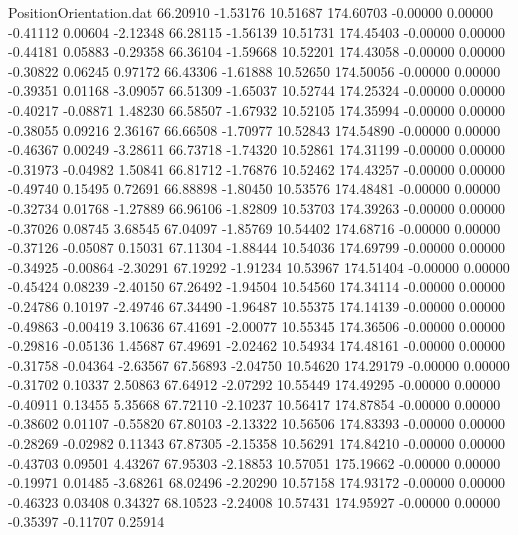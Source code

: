 \begin{filecontents}{PositionOrientation.dat}
  66.20910   -1.53176   10.51687   174.60703   -0.00000    0.00000   -0.41112    0.00604   -2.12348
  66.28115   -1.56139   10.51731   174.45403   -0.00000    0.00000   -0.44181    0.05883   -0.29358
  66.36104   -1.59668   10.52201   174.43058   -0.00000    0.00000   -0.30822    0.06245    0.97172
  66.43306   -1.61888   10.52650   174.50056   -0.00000    0.00000   -0.39351    0.01168   -3.09057
  66.51309   -1.65037   10.52744   174.25324   -0.00000    0.00000   -0.40217   -0.08871    1.48230
  66.58507   -1.67932   10.52105   174.35994   -0.00000    0.00000   -0.38055    0.09216    2.36167
  66.66508   -1.70977   10.52843   174.54890   -0.00000    0.00000   -0.46367    0.00249   -3.28611
  66.73718   -1.74320   10.52861   174.31199   -0.00000    0.00000   -0.31973   -0.04982    1.50841
  66.81712   -1.76876   10.52462   174.43257   -0.00000    0.00000   -0.49740    0.15495    0.72691
  66.88898   -1.80450   10.53576   174.48481   -0.00000    0.00000   -0.32734    0.01768   -1.27889
  66.96106   -1.82809   10.53703   174.39263   -0.00000    0.00000   -0.37026    0.08745    3.68545
  67.04097   -1.85769   10.54402   174.68716   -0.00000    0.00000   -0.37126   -0.05087    0.15031
  67.11304   -1.88444   10.54036   174.69799   -0.00000    0.00000   -0.34925   -0.00864   -2.30291
  67.19292   -1.91234   10.53967   174.51404   -0.00000    0.00000   -0.45424    0.08239   -2.40150
  67.26492   -1.94504   10.54560   174.34114   -0.00000    0.00000   -0.24786    0.10197   -2.49746
  67.34490   -1.96487   10.55375   174.14139   -0.00000    0.00000   -0.49863   -0.00419    3.10636
  67.41691   -2.00077   10.55345   174.36506   -0.00000    0.00000   -0.29816   -0.05136    1.45687
  67.49691   -2.02462   10.54934   174.48161   -0.00000    0.00000   -0.31758   -0.04364   -2.63567
  67.56893   -2.04750   10.54620   174.29179   -0.00000    0.00000   -0.31702    0.10337    2.50863
  67.64912   -2.07292   10.55449   174.49295   -0.00000    0.00000   -0.40911    0.13455    5.35668
  67.72110   -2.10237   10.56417   174.87854   -0.00000    0.00000   -0.38602    0.01107   -0.55820
  67.80103   -2.13322   10.56506   174.83393   -0.00000    0.00000   -0.28269   -0.02982    0.11343
  67.87305   -2.15358   10.56291   174.84210   -0.00000    0.00000   -0.43703    0.09501    4.43267
  67.95303   -2.18853   10.57051   175.19662   -0.00000    0.00000   -0.19971    0.01485   -3.68261
  68.02496   -2.20290   10.57158   174.93172   -0.00000    0.00000   -0.46323    0.03408    0.34327
  68.10523   -2.24008   10.57431   174.95927   -0.00000    0.00000   -0.35397   -0.11707    0.25914

\end{filecontents}

